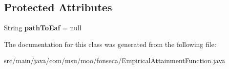 \subsection*{Protected Attributes}
\begin{DoxyCompactItemize}
\item 
\hypertarget{classcom_1_1msu_1_1moo_1_1fonseca_1_1EmpiricalAttainmentFunction_abd2994d78f446abb2920988c29c9a7bf}{String {\bfseries path\-To\-Eaf} = null}\label{classcom_1_1msu_1_1moo_1_1fonseca_1_1EmpiricalAttainmentFunction_abd2994d78f446abb2920988c29c9a7bf}

\end{DoxyCompactItemize}


The documentation for this class was generated from the following file\-:\begin{DoxyCompactItemize}
\item 
src/main/java/com/msu/moo/fonseca/Empirical\-Attainment\-Function.\-java\end{DoxyCompactItemize}
